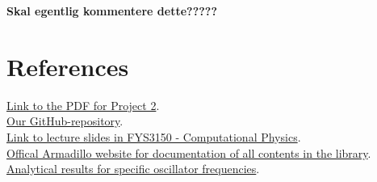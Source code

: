 \documentclass{article}
\begin{document}
\textbf{Skal egentlig kommentere dette?????} \\






\vspace{1cm}

\section{References} \label{sec:References}

\href{https://github.com/CompPhysics/ComputationalPhysics/blob/master/doc/Projects/2019/Project2/pdf/Project2.pdf}{Link to the PDF for Project 2}. \\

\href{https://github.com/Erikbgram/Fys3150}{Our GitHub-repository}. \\

\href{https://github.com/CompPhysics/ComputationalPhysics/blob/master/doc/Lectures/lectures2015.pdf}{Link to lecture slides in FYS3150 - Computational Physics}. \\

\href{http://arma.sourceforge.net/docs.html#eig_sym}{Offical Armadillo website for documentation of all contents in the library}. \\

\href{https://journals.aps.org/pra/pdf/10.1103/PhysRevA.48.3561}{Analytical results for specific oscillator frequencies}. \\








\end{document}

